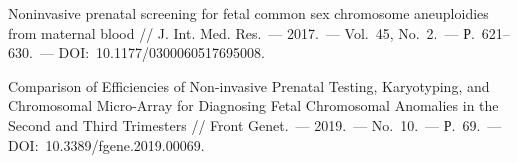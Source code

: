 \begin{thebibliography}{99}
\bibitem{} Noninvasive prenatal screening for fetal common sex chromosome aneuploidies from maternal blood // J. Int. Med. Res.~--- 2017.~--- Vol.~45, No.~2.~--- Р.~621--630.~--- DOI:~10.1177/0300060517695008.

\bibitem{} Comparison of Efficiencies of Non-invasive Prenatal Testing, Karyotyping, and Chromosomal Micro-Array for Diagnosing Fetal Chromosomal Anomalies in the Second and Third Trimesters // Front Genet.~--- 2019.~--- No.~10.~--- Р.~69.~--- DOI:~10.3389/fgene.2019.00069.
\end{thebibliography}
\thispagestyle{empty}
